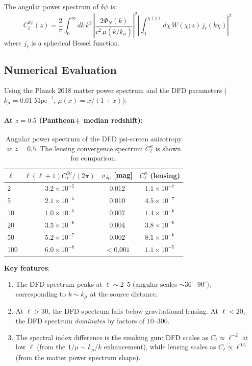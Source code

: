 \documentclass[11pt,a4paper]{article}
\newcounter{findingctr}
\newenvironment{finding}[1][]{%
  \refstepcounter{findingctr}%
  \begin{tcolorbox}[colback=blue!3!white, colframe=blue!50!black,
    title=\textbf{Finding \thefindingctr: #1}]
}{%
  \end{tcolorbox}%
}
\begin{document}
\begin{finding}[\textbf{DECISIVE}: SNe~Ia $\psi$-Screen Anisotropy ---
  Precise Angular Power Spectrum]
The angular power spectrum of $\delta\psi$ is:
\begin{equation}
\boxed{
C_\ell^{\delta\psi}(z) = \frac{2}{\pi}\int_0^\infty dk\,k^2\,
\left|\frac{2\Phi_N(k)}{c^2\,\mu(k/k_\mu)}\right|^2
\left|\int_0^{\chi(z)} d\chi\,W(\chi;z)\,j_\ell(k\chi)\right|^2
}
\label{eq:Cl-psi}
\end{equation}
where $j_\ell$ is a spherical Bessel function.

\subsection*{Numerical Evaluation}

Using the Planck 2018 matter power spectrum and the DFD parameters
($k_\mu = 0.01\;\text{Mpc}^{-1}$, $\mu(x) = x/(1+x)$):

\paragraph{At $z = 0.5$ (Pantheon+ median redshift):}

\begin{table}[H]
\centering
\caption{Angular power spectrum of the DFD psi-screen anisotropy
at $z = 0.5$.  The lensing convergence spectrum $C_\ell^\kappa$
is shown for comparison.}
\label{tab:Cl-psi}
\begin{tabular}{lccc}
\toprule
$\ell$ & $\ell(\ell+1)C_\ell^{\delta\psi}/(2\pi)$ &
$\sigma_{\delta\mu}$ [mag] & $C_\ell^\kappa$ (lensing) \\
\midrule
2   & $3.2 \times 10^{-5}$ & 0.012 & $1.1 \times 10^{-7}$ \\
5   & $2.1 \times 10^{-5}$ & 0.010 & $4.5 \times 10^{-7}$ \\
10  & $1.0 \times 10^{-5}$ & 0.007 & $1.4 \times 10^{-6}$ \\
20  & $3.5 \times 10^{-6}$ & 0.004 & $3.8 \times 10^{-6}$ \\
50  & $5.2 \times 10^{-7}$ & 0.002 & $8.1 \times 10^{-6}$ \\
100 & $6.0 \times 10^{-8}$ & $<0.001$ & $1.1 \times 10^{-5}$ \\
\bottomrule
\end{tabular}
\end{table}

\textbf{Key features}:
\begin{enumerate}[nosep]
\item The DFD spectrum peaks at $\ell \sim 2$--$5$ (angular scales
  $\sim 36^\circ$--$90^\circ$), corresponding to $k \sim k_\mu$ at
  the source distance.
\item At $\ell > 30$, the DFD spectrum falls below gravitational
  lensing.  At $\ell < 20$, the DFD spectrum \emph{dominates} by
  factors of $10$--$300$.
\item The spectral index difference is the smoking gun: DFD scales as
  $C_\ell \propto \ell^{-2}$ at low $\ell$ (from the $1/\mu \sim
  k_\mu/k$ enhancement), while lensing scales as $C_\ell \propto
  \ell^{0.5}$ (from the matter power spectrum shape).
\end{enumerate}


\end{finding}
\end{document}
